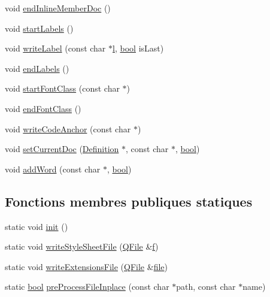 \begin{DoxyCompactItemize}
void \hyperlink{class_r_t_f_generator_a20f66586492ba04de6f0a6c57e4aefa6}{end\+Inline\+Member\+Doc} ()
\item 
void \hyperlink{class_r_t_f_generator_a7ac65450689663a29331090a1329ea75}{start\+Labels} ()
\item 
void \hyperlink{class_r_t_f_generator_a21da1a74e7ed943dc3cf613ecd23791f}{write\+Label} (const char $\ast$\hyperlink{060__command__switch_8tcl_aff56f84b49947b84b2a304f51cf8e678}{l}, \hyperlink{qglobal_8h_a1062901a7428fdd9c7f180f5e01ea056}{bool} is\+Last)
\item 
void \hyperlink{class_r_t_f_generator_a05613171c01f474ba7684b7ef619421e}{end\+Labels} ()
\item 
void \hyperlink{class_r_t_f_generator_a84114371fc0f3865e0321c2df8ce0ae9}{start\+Font\+Class} (const char $\ast$)
\item 
void \hyperlink{class_r_t_f_generator_a8753e9a10c126e0f8b9af7ff9783afcd}{end\+Font\+Class} ()
\item 
void \hyperlink{class_r_t_f_generator_a01b1cb771ecbdb9da62b21c980d1a5ae}{write\+Code\+Anchor} (const char $\ast$)
\item 
void \hyperlink{class_r_t_f_generator_a38af98ffc41789449c0204dcde02b7dd}{set\+Current\+Doc} (\hyperlink{class_definition}{Definition} $\ast$, const char $\ast$, \hyperlink{qglobal_8h_a1062901a7428fdd9c7f180f5e01ea056}{bool})
\item 
void \hyperlink{class_r_t_f_generator_af386b517dfdb4b5b5c02cfd2bae5761e}{add\+Word} (const char $\ast$, \hyperlink{qglobal_8h_a1062901a7428fdd9c7f180f5e01ea056}{bool})
\end{DoxyCompactItemize}
\subsection*{Fonctions membres publiques statiques}
\begin{DoxyCompactItemize}
\item 
static void \hyperlink{class_r_t_f_generator_a20ebc13fc3ca037f977dc8144847db73}{init} ()
\item 
static void \hyperlink{class_r_t_f_generator_ace992afab84a2ac7a56ee2b08bff737b}{write\+Style\+Sheet\+File} (\hyperlink{class_q_file}{Q\+File} \&\hyperlink{060__command__switch_8tcl_af6830d2c644b45088ea8f1f74a46b778}{f})
\item 
static void \hyperlink{class_r_t_f_generator_af4a5c00a65aa5e8ba2aab342b171584d}{write\+Extensions\+File} (\hyperlink{class_q_file}{Q\+File} \&\hyperlink{class_output_generator_aed5ad11c3844cdf71ec6fee6c1c84286}{file})
\item 
static \hyperlink{qglobal_8h_a1062901a7428fdd9c7f180f5e01ea056}{bool} \hyperlink{class_r_t_f_generator_a62498deb4b617b2cfb75381f6508a4ed}{pre\+Process\+File\+Inplace} (const char $\ast$path, const char $\ast$name)
\end{DoxyCompactItemize}
